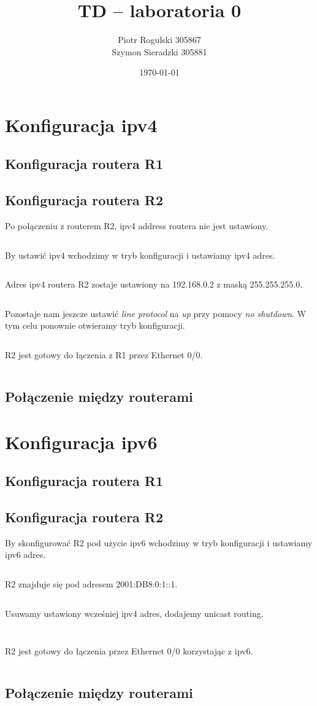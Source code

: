 \documentclass[a4paper,12pt,notitlepage]{article}
\title{\textbf{TD -- laboratoria 0}}
\author{Piotr Rogulski 305867 \\ Szymon Sieradzki 305881}
\date{\today}
\begin{document}
\maketitle


\section{Konfiguracja ipv4}
\subsection{Konfiguracja routera R1}
\subsection{Konfiguracja routera R2}
Po połączeniu z routerem R2, ipv4 address routera nie jest ustawiony.
\inputminted[label=Output, firstline=88, lastline=111]{text}{R2.txt}
By ustawić ipv4 wchodzimy w tryb konfiguracji i ustawiamy ipv4 adres.
\inputminted[label=Output, firstline=113, lastline=120]{text}{R2.txt}
Adres ipv4 routera R2 zostaje ustawiony na 192.168.0.2 z maską 255.255.255.0.
\inputminted[label=Output, firstline=121, lastline=144]{text}{R2.txt}
Pozostaje nam jeszcze ustawić \textit{line protocol} na \textit{up} przy pomocy \textit{no shutdown}. W tym celu ponownie otwieramy tryb konfiguracji.
\inputminted[label=Output, firstline=147, lastline=157]{text}{R2.txt}
R2 jest gotowy do łączenia z R1 przez Ethernet 0/0.
\inputminted[label=Output, firstline=162, lastline=185]{text}{R2.txt}
\subsection{Połączenie między routerami}
\section{Konfiguracja ipv6}
\subsection{Konfiguracja routera R1}
\subsection{Konfiguracja routera R2}
By skonfigurować R2 pod użycie ipv6 wchodzimy w tryb konfiguracji i ustawiamy ipv6 adres.
\inputminted[label=Output, firstline=272, lastline=283]{text}{R2.txt}
R2 znajduje się pod adresem 2001:DB8:0:1::1.
\inputminted[label=Output, firstline=309, lastline=323]{text}{R2.txt}
Usuwamy ustawiony wcześniej ipv4 adres, dodajemy unicast routing.
\inputminted[label=Output, firstline=324, lastline=329]{text}{R2.txt}
\inputminted[label=Output, firstline=376, lastline=382]{text}{R2.txt}
R2 jest gotowy do łączenia przez Ethernet 0/0 korzystając z ipv6.
\inputminted[label=Output, firstline=383, lastline=402]{text}{R2.txt}
\subsection{Połączenie między routerami}
\end{document}
